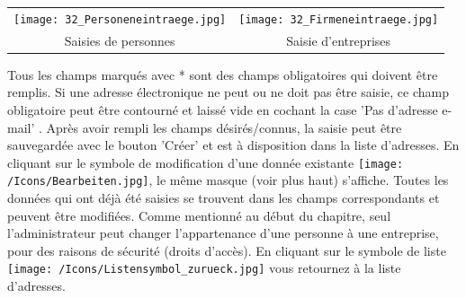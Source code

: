 \vspace{\baselineskip}

\begin{tabular}{cc} %
\texttt{[image: 32\_Personeneintraege.jpg]} & \texttt{[image: 32\_Firmeneintraege.jpg]} \\
Saisies de personnes & Saisie d'entreprises\\
\end{tabular}


\vspace{\baselineskip}
Tous les champs marqués avec * sont des champs obligatoires qui doivent être remplis. Si une adresse électronique ne peut ou ne doit pas être saisie, ce champ obligatoire peut être contourné et laissé vide en cochant la case 'Pas d'adresse e-mail' . Après avoir rempli les champs désirés/connus, la saisie peut être sauvegardée avec le bouton 'Créer'  et est à disposition dans la liste d'adresses. En cliquant sur le symbole de modification d'une donnée existante \texttt{[image: /Icons/Bearbeiten.jpg]}, le même masque (voir plus haut) s'affiche. Toutes les données qui ont déjà été saisies se trouvent dans les champs correspondants et peuvent être modifiées. Comme mentionné au début du chapitre, seul l'administrateur peut changer l'appartenance d'une personne à une entreprise, pour des raisons de sécurité (droits d'accès).\newline
En cliquant sur le symbole de liste \texttt{[image: /Icons/Listensymbol\_zurueck.jpg]}  vous retournez à la liste d'adresses.
